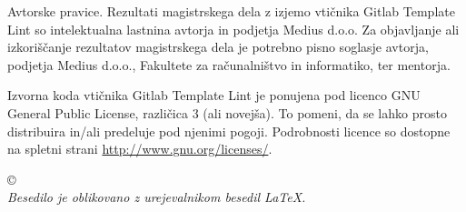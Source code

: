 \thispagestyle{empty}
\vspace*{\fill}
{\noindent\footnotesize


\vspace*{5cm}
{\small \noindent
{\sc Avtorske pravice}.
Rezultati magistrskega dela z izjemo vtičnika Gitlab Template Lint so intelektualna lastnina avtorja in podjetja Medius d.o.o. Za objavljanje ali izkoriščanje rezultatov ma\-gi\-str\-ske\-ga dela je potrebno pisno soglasje avtorja, podjetja Medius d.o.o., Fakultete za ra\-ču\-nal\-niš\-tvo in informatiko, ter mentorja.
}





\vspace*{1.5cm}
{\small \noindent
Izvorna koda vtičnika Gitlab Template Lint je ponujena pod licenco GNU General Public License,
različica 3 (ali novejša). To pomeni, da se lahko prosto distribuira in/ali predeluje pod njenimi pogoji.
Podrobnosti licence so dostopne na spletni strani \url{http://www.gnu.org/licenses/}.
}


}
\begin{center}
{\footnotesize{\sc \copyright \myyear\ \tauthor}}
\ \\ \vfill
{\em
Besedilo je oblikovano z urejevalnikom besedil \LaTeX.}
\end{center}